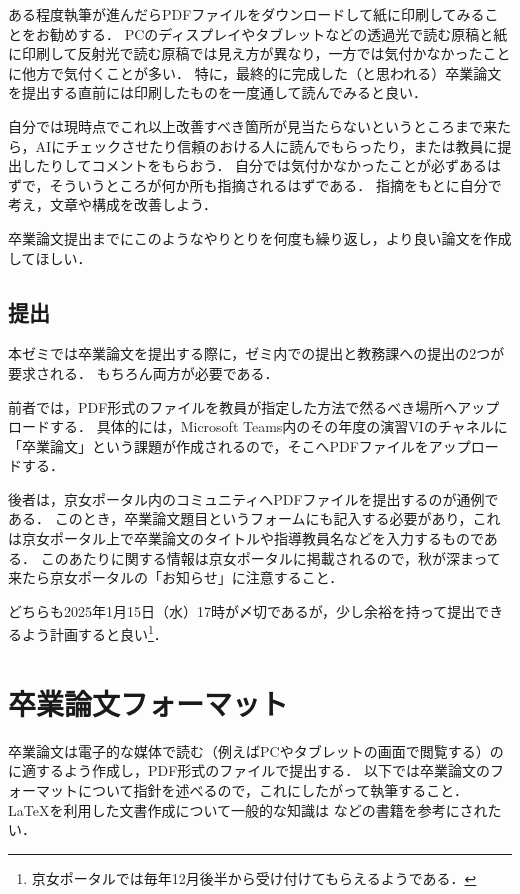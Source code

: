 \documentclass[a4paper,twocolumn,10pt]{jsarticle}
\begin{document}
ある程度執筆が進んだらPDFファイルをダウンロードして紙に印刷してみることをお勧めする．
PCのディスプレイやタブレットなどの透過光で読む原稿と紙に印刷して反射光で読む原稿では見え方が異なり，一方では気付かなかったことに他方で気付くことが多い．
特に，最終的に完成した（と思われる）卒業論文を提出する直前には印刷したものを一度通して読んでみると良い．

自分では現時点でこれ以上改善すべき箇所が見当たらないというところまで来たら，AIにチェックさせたり信頼のおける人に読んでもらったり，または教員に提出したりしてコメントをもらおう．
自分では気付かなかったことが必ずあるはずで，そういうところが何か所も指摘されるはずである．
指摘をもとに自分で考え，文章や構成を改善しよう．

卒業論文提出までにこのようなやりとりを何度も繰り返し，より良い論文を作成してほしい．

\subsection{提出}

本ゼミでは卒業論文を提出する際に，ゼミ内での提出と教務課への提出の2つが要求される．
もちろん両方が必要である．

前者では，PDF形式のファイルを教員が指定した方法で然るべき場所へアップロードする．
具体的には，Microsoft Teams内のその年度の演習VIのチャネルに「卒業論文」という課題が作成されるので，そこへPDFファイルをアップロードする．

後者は，京女ポータル内のコミュニティへPDFファイルを提出するのが通例である．
このとき，卒業論文題目というフォームにも記入する必要があり，これは京女ポータル上で卒業論文のタイトルや指導教員名などを入力するものである．
このあたりに関する情報は京女ポータルに掲載されるので，秋が深まって来たら京女ポータルの「お知らせ」に注意すること．

どちらも2025年1月15日（水）17時が〆切であるが，少し余裕を持って提出できるよう計画すると良い\footnote{京女ポータルでは毎年12月後半から受け付けてもらえるようである．}．

\section{卒業論文フォーマット}
\label{sec:format}

卒業論文は電子的な媒体で読む（例えばPCやタブレットの画面で閲覧する）のに適するよう作成し，PDF形式のファイルで提出する．
以下では卒業論文のフォーマットについて指針を述べるので，これにしたがって執筆すること．
\LaTeX を利用した文書作成について一般的な知識は \cite{okumura2020} などの書籍を参考にされたい．
\end{document}
